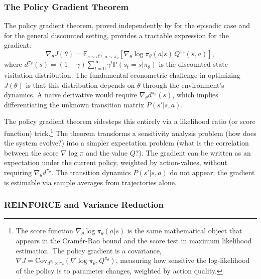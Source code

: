 \subsubsection{The Policy Gradient Theorem}

The policy gradient theorem, proved independently by \citet{williams1992} for the episodic case and \citet{SuttonMcAllester2000} for the general discounted setting, provides a tractable expression for the gradient:
\begin{equation}
\nabla_\theta J(\theta) = \mathbb{E}_{s \sim d^{\pi_\theta}, a \sim \pi_\theta} \left[ \nabla_\theta \log \pi_\theta(a|s) \, Q^{\pi_\theta}(s,a) \right],
\label{eq:policy_gradient}
\end{equation}
where $d^{\pi_\theta}(s) = (1-\gamma) \sum_{t=0}^\infty \gamma^t \mathbb{P}(s_t = s | \pi_\theta)$ is the discounted state visitation distribution. The fundamental econometric challenge in optimizing $J(\theta)$ is that this distribution depends on $\theta$ through the environment's dynamics. A naive derivative would require $\nabla_\theta d^{\pi_\theta}(s)$, which implies differentiating the unknown transition matrix $P(s'|s,a)$.

The policy gradient theorem sidesteps this entirely via a likelihood ratio (or score function) trick.\footnote{The score function $\nabla_\theta \log \pi_\theta(a|s)$ is the same mathematical object that appears in the Cram\'er-Rao bound and the score test in maximum likelihood estimation. The policy gradient is a covariance, $\nabla J = \text{Cov}_{d^{\pi_\theta} \times \pi_\theta}(\nabla \log \pi_\theta, Q^{\pi_\theta})$, measuring how sensitive the log-likelihood of the policy is to parameter changes, weighted by action quality.} The theorem transforms a sensitivity analysis problem (how does the system evolve?) into a simpler expectation problem (what is the correlation between the score $\nabla \log \pi$ and the value $Q$?). The gradient can be written as an expectation under the current policy, weighted by action-values, without requiring $\nabla_\theta d^{\pi_\theta}$. The transition dynamics $P(s'|s,a)$ do not appear; the gradient is estimable via sample averages from trajectories alone.

\subsubsection{REINFORCE and Variance Reduction}

